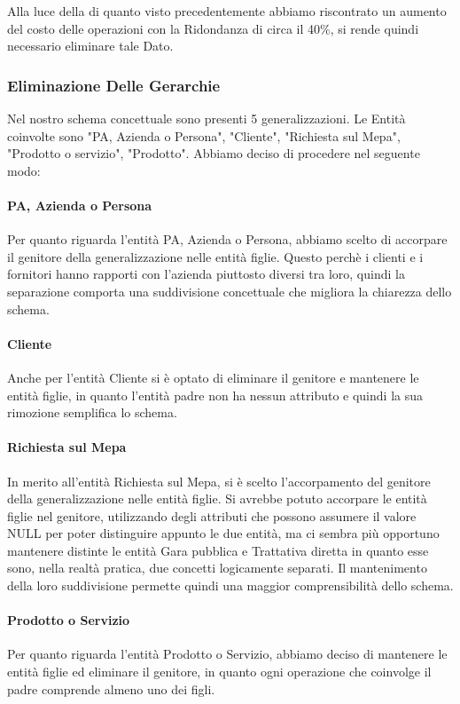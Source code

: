Alla luce della di quanto visto precedentemente abbiamo riscontrato un aumento del costo delle operazioni con la Ridondanza di circa il 40\%, si rende quindi necessario eliminare tale Dato.


\newpage
\subsubsection{Eliminazione Delle Gerarchie}

Nel nostro schema concettuale sono presenti 5 generalizzazioni. Le Entità coinvolte sono "PA, Azienda o Persona", "Cliente", "Richiesta sul Mepa", "Prodotto o servizio", "Prodotto".
\newline
Abbiamo deciso di procedere nel seguente modo:

\paragraph{PA, Azienda o Persona}
Per quanto riguarda l'entità PA, Azienda o Persona, abbiamo scelto di accorpare il genitore della generalizzazione nelle entità figlie. Questo perchè i clienti e i fornitori hanno rapporti con l'azienda piuttosto diversi tra loro, quindi la separazione comporta una suddivisione concettuale che migliora la chiarezza dello schema.
\paragraph{Cliente}
Anche per l'entità Cliente si è optato di eliminare il genitore e mantenere le entità figlie, in quanto l'entità padre non ha nessun attributo e quindi la sua rimozione semplifica lo schema.
\paragraph{Richiesta sul Mepa}
In merito all'entità Richiesta sul Mepa, si è scelto l'accorpamento del genitore della generalizzazione nelle entità figlie. Si avrebbe potuto accorpare le entità figlie nel genitore, utilizzando degli attributi che possono assumere il valore NULL per poter distinguire appunto le due entità, ma ci sembra più opportuno mantenere distinte le entità Gara pubblica e Trattativa diretta in quanto esse sono, nella realtà pratica, due concetti logicamente separati. Il mantenimento della loro suddivisione permette quindi una maggior comprensibilità dello schema.
\paragraph{Prodotto o Servizio}
Per quanto riguarda l'entità Prodotto o Servizio, abbiamo deciso di mantenere le entità figlie ed eliminare il genitore, in quanto ogni operazione che coinvolge il padre comprende almeno uno dei figli.
